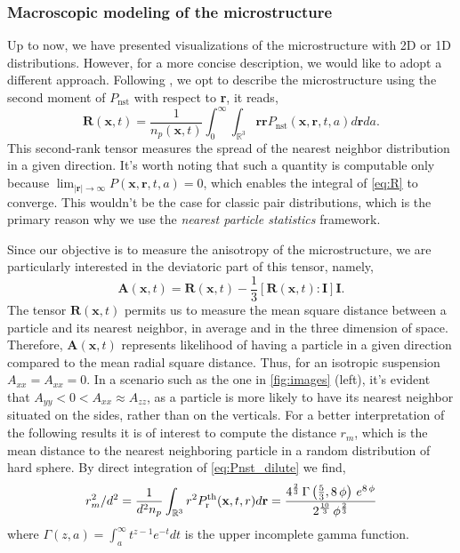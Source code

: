 \subsubsection*{Macroscopic modeling of the microstructure}
Up to now, we have presented visualizations of the microstructure with 2D or 1D distributions. 
However, for a more concise description, we would like to adopt a different approach. 
Following \citet{zhang2023evolution}, we opt to describe the microstructure using the second moment of $P_\text{nst}$ with respect to \textbf{r}, it reads,
\begin{equation}
    \textbf{R}(\textbf{x},t) =\frac{1}{n_p(\textbf{x},t)} 
    \int_0^\infty 
    \int_{\mathbb{R}^3} \textbf{rr} P_\text{nst}(\textbf{x},\textbf{r},t,a) d\textbf{r} da.
    \label{eq:R}
\end{equation}
This second-rank tensor measures the spread of the nearest neighbor distribution in a given direction. 
It's worth noting that such a quantity is computable only because $\lim_{|\textbf{r}|\to \infty} P(\textbf{x},\textbf{r},t,a) = 0$, which enables the integral of \ref{eq:R} to converge. 
This wouldn't be the case for classic pair distributions, which is the primary reason why we use the \textit{nearest particle statistics} framework. 

Since our objective is to measure the anisotropy of the microstructure, we are particularly interested in the deviatoric part of this tensor, namely,
\begin{equation*}
    \textbf{A}(\textbf{x},t) = \textbf{R}(\textbf{x},t) - \frac{1}{3} [\textbf{R}(\textbf{x},t) : \textbf{I}] \textbf{I}.
\end{equation*}
The tensor $\textbf{R}(\textbf{x},t)$ permits us to measure the mean square distance between a particle and its nearest neighbor, in average and in the three dimension of space. 
Therefore, $\textbf{A}(\textbf{x},t)$ represents likelihood of having a particle in a given direction compared to the mean radial square distance. 
Thus, for an isotropic suspension $A_{xx} = A_{xx} = 0$. 
In a scenario such as the one in \ref{fig:images} (left), it's evident that $A_{yy} < 0 < A_{xx} \approx A_{zz}$, as a particle is more likely to have its nearest neighbor situated on the sides, rather than on the verticals.
For a better interpretation of the following results it is of interest to compute the distance $r_m$, which is the mean distance to the nearest neighboring particle in a random distribution of hard sphere. 
By direct integration of \ref{eq:Pnst_dilute} we find, 
\begin{equation*}
    r_m^2 /d^2
    = \frac{1}{d^2n_p} 
    \int_{\mathbb{R}^3} r^2 P_\text{r}^\text{th}(\textbf{x},t,r) d\textbf{r} 
    = {{4^{{{2}\over{3}}}\,\Gamma\left({{5}\over{3}} , 8\,\phi\right)
    \,e^{8\,\phi}}\over{2^{{{10}\over{3}}}\,\phi^{{{2}\over{3}}}}}
\end{equation*}
where $\Gamma(z,a) = \int_a^\infty t^{z-1} e^{-t} dt$ is the upper incomplete gamma function. 

